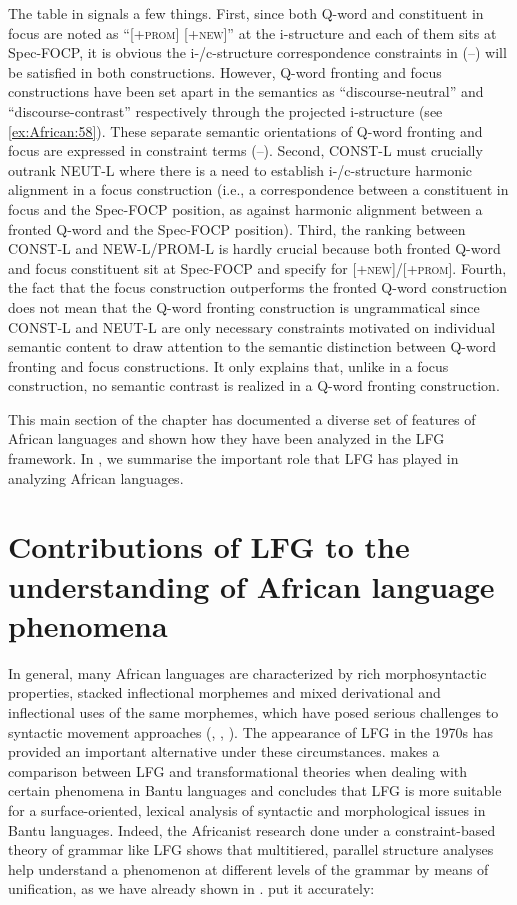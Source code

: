 \documentclass[output=paper,hidelinks]{langscibook}
\begin{document}
The table in  signals a few things. First, since both Q-word and constituent in focus are noted as “[+\textsc{prom}] [+\textsc{new}]” at the i-structure and each of them sits at Spec-FOCP, it is obvious the i-/c-structure correspondence constraints in (--) will be satisfied in both constructions. However, Q-word fronting and focus constructions have been set apart in the semantics as “discourse-neutral” and “discourse{}-contrast” respectively through the projected i-structure (see \ref{ex:African:58}). These separate semantic orientations of Q-word fronting and focus are expressed in constraint terms (--). Second, CONST-L must crucially outrank NEUT-L where there is a need to establish i-/c-structure harmonic alignment in a focus construction (i.e., a correspondence between a constituent in focus and the Spec-FOCP position, as against harmonic alignment between a fronted Q-word and the Spec-FOCP position). Third, the ranking between CONST-L and NEW-L/PROM-L is hardly crucial because both fronted Q-word and focus constituent sit at Spec-FOCP and specify for [+\textsc{new}]/[+\textsc{prom}]. Fourth, the fact that the focus construction outperforms the fronted Q-word construction does not mean that the Q-word fronting construction is ungrammatical since CONST-L and NEUT-L are only necessary constraints motivated on individual semantic content to draw attention to the semantic distinction between Q-word fronting and focus constructions. It only explains that, unlike in a focus construction, no semantic contrast is realized in a Q-word fronting construction.

This main section of the chapter has documented a diverse set of features of African languages and shown how they have been analyzed in the LFG framework. In , we summarise the important role that LFG has played in analyzing African languages.

\section{Contributions of LFG to the understanding of African language phenomena}
\label{sec:African:3}
\largerpage
In general, many African languages are characterized by rich morphosyntactic properties, stacked inflectional morphemes and mixed derivational and inflectional uses of the same morphemes, which have posed serious challenges to syntactic movement approaches (\citealt{Mchombo1980}, \citealt{MchomboMtenje1983}, \citealt{Bresnan:Architecture}). The appearance of LFG in the 1970s has provided an important alternative under these circumstances. \citet{Petzell2004} makes a comparison between LFG and transformational theories when dealing with certain phenomena in Bantu languages and concludes that LFG is more suitable for a surface-oriented, lexical analysis of syntactic and morphological issues in Bantu languages. Indeed, the Africanist research done under a constraint-based theory of grammar like LFG shows that multitiered, parallel structure analyses help understand a phenomenon at different levels of the grammar by means of unification, as we have already shown in . \citet{bresnan1989locative} put it accurately:
\end{document}
